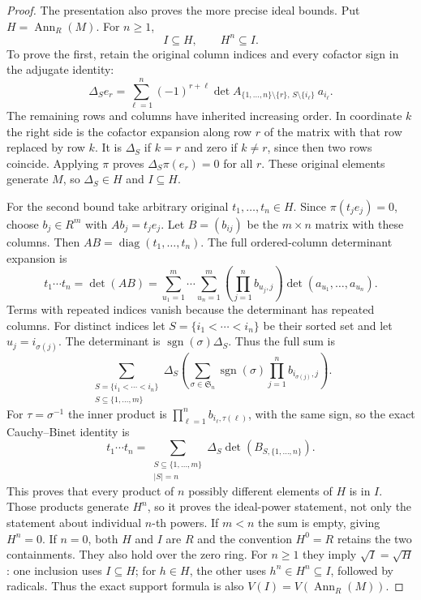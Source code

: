 \begin{proof}
\medskip\noindent
The presentation also proves the more precise ideal
bounds. Put $H=\operatorname{Ann}_R(M)$. For $n\geq1$,
$$
I\subseteq H,\qquad H^n\subseteq I.
$$
To prove the first, retain the original column indices
and every cofactor sign in the adjugate identity:
$$
\Delta_Se_r
=\sum_{\ell=1}^n(-1)^{r+\ell}
\det A_{\{1,\ldots,n\}\setminus\{r\},\,
S\setminus\{i_\ell\}}\ a_{i_\ell}.
$$
The remaining rows and columns have inherited increasing
order. In coordinate $k$ the right side is the cofactor
expansion along row $r$ of the matrix with that row
replaced by row $k$. It is $\Delta_S$ if $k=r$ and
zero if $k\ne r$, since then two rows coincide.
Applying $\pi$ proves $\Delta_S\pi(e_r)=0$ for all
$r$. These original elements generate $M$, so
$\Delta_S\in H$ and $I\subseteq H$.

For the second bound take arbitrary original
$t_1,\ldots,t_n\in H$. Since $\pi(t_je_j)=0$,
choose $b_j\in R^m$ with $Ab_j=t_je_j$.
Let $B=(b_{ij})$ be the $m\times n$ matrix with these
columns. Then $AB=\operatorname{diag}(t_1,\ldots,t_n)$.
The full ordered-column determinant expansion is
$$
t_1\cdots t_n=\det(AB)
=\sum_{u_1=1}^m\cdots\sum_{u_n=1}^m
\left(\prod_{j=1}^n b_{u_j,j}\right)
\det(a_{u_1},\ldots,a_{u_n}).
$$
Terms with repeated indices vanish because the determinant
has repeated columns. For distinct indices let
$S=\{i_1<\cdots<i_n\}$ be their sorted set and let
$u_j=i_{\sigma(j)}$. The determinant is
$\operatorname{sgn}(\sigma)\Delta_S$. Thus the full sum is
$$
\sum_{\substack{S=\{i_1<\cdots<i_n\}\\S\subseteq\{1,\ldots,m\}}}
\Delta_S
\left(\sum_{\sigma\in\mathfrak S_n}
\operatorname{sgn}(\sigma)\prod_{j=1}^n b_{i_{\sigma(j)},j}\right).
$$
For $\tau=\sigma^{-1}$ the inner product is
$\prod_{\ell=1}^n b_{i_\ell,\tau(\ell)}$, with the same
sign, so the exact Cauchy--Binet identity is
$$
t_1\cdots t_n
=\sum_{\substack{S\subseteq\{1,\ldots,m\}\\|S|=n}}
\Delta_S\det(B_{S,\{1,\ldots,n\}}).
$$
This proves that every product of $n$ possibly different
elements of $H$ is in $I$. Those products generate $H^n$,
so it proves the ideal-power statement, not only the
statement about individual $n$-th powers. If $m<n$
the sum is empty, giving $H^n=0$. If $n=0$, both $H$
and $I$ are $R$ and the convention $H^0=R$ retains the
two containments. They also hold over the zero ring.
For $n\geq1$ they imply $\sqrt I=\sqrt H$: one inclusion
uses $I\subseteq H$; for $h\in H$, the other uses
$h^n\in H^n\subseteq I$, followed by radicals.
Thus the exact support formula is also
$V(I)=V(\operatorname{Ann}_R(M))$.


\end{proof}
